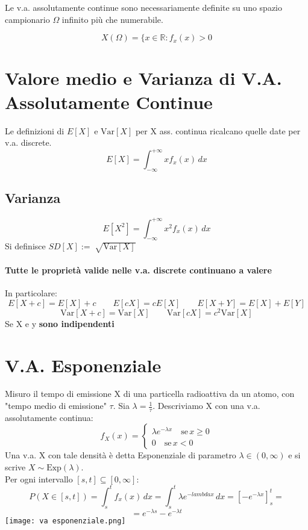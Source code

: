 	Le v.a. assolutamente continue sono necessariamente definite su uno spazio campionario
$\Omega$ infinito più che numerabile.

	\begin{equation*}
		X(\Omega) = \{ x \in \mathbb{R} : f_x (x) > 0
	\end{equation*}

	\section{Valore medio e Varianza di V.A. Assolutamente Continue}
	Le definizioni di $E[X]$ e $\text{Var}[X]$ per X ass. continua ricalcano quelle date per
	v.a. discrete.
	\begin{equation*}
		E[X] = \int_{-\infty}^{+\infty} x f_x(x) \,dx
	\end{equation*}
	\subsection*{Varianza}
	\begin{equation*}
		E[X^2] = \int_{-\infty}^{+\infty} x^2 f_x(x) \,dx
	\end{equation*}
	Si definisce $SD[X] := \sqrt[]{\text{Var}[X]}$
	\paragraph*{Tutte le proprietà valide nelle v.a. discrete continuano a valere}
	In particolare:
	\begin{equation*}
		E[X+c] = E[X] + c \qquad E[cX] = cE[X] \qquad E[X+Y] = E[X] + E[Y]
	\end{equation*}
	\begin{equation*}
		\text{Var}[X+c] = \text{Var}[X] \qquad \text{Var}[cX] = c^2 \text{Var}[X]
	\end{equation*}
	Se X e y \textbf{sono indipendenti}
	\section{V.A. Esponenziale}
	Misuro il tempo di emissione X di una particella radioattiva da un atomo, con
	"tempo medio di emissione" $\tau$. Sia $\lambda = \frac{1}{\tau}$.
	Descriviamo X con una v.a. assolutamente continua:
	\begin{equation*}
		f_X(x) =
		\begin{cases}
			\lambda e^{-\lambda x} \quad \text{se} \, x \geq 0 \\
			0 \quad \text{se} \, x < 0
		\end{cases}
	\end{equation*}
	Una v.a. X con tale densità è detta Esponenziale di parametro $\lambda \in (0, \infty)$
	e si scrive $X \sim \text{Exp}(\lambda)$.
	\\ Per ogni intervallo $[s, t] \subseteq [0, \infty]$:
	\begin{equation*}
		P(X \in [s, t]) = \int_{s}^{t} f_x(x)\,dx = \int_{s}^{t} \lambda e^{-lambda x}\,dx=
			[- e^{-\lambda x}]_{s}^{t} =
	\end{equation*}
	\begin{equation*}
		= e^{-\lambda s} - e^{-\lambda t}
	\end{equation*}
	\texttt{[image: va esponenziale.png]}
